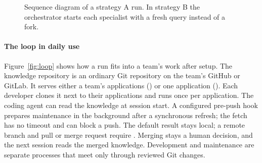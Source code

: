 \begin{figure}[htbp]
\centering
{}
\caption{Sequence diagram of a strategy A run. In strategy B the orchestrator starts each specialist with a fresh query instead of a fork.}
\label{fig:seq}
\end{figure}

\paragraph{The loop in daily use} Figure~\ref{fig:loop} shows how a run fits into a team's work after setup. The knowledge repository is an ordinary Git repository on the team's GitHub or GitLab. It serves either a team's applications () or one application (). Each developer clones it next to their applications and runs  once per application. The coding agent can read the knowledge at session start. A configured pre-push hook prepares maintenance in the background after a synchronous refresh; the fetch has no timeout and can block a push. The default result stays local; a remote branch and pull or merge request require . Merging stays a human decision, and the next session reads the merged knowledge. Development and maintenance are separate processes that meet only through reviewed Git changes.

